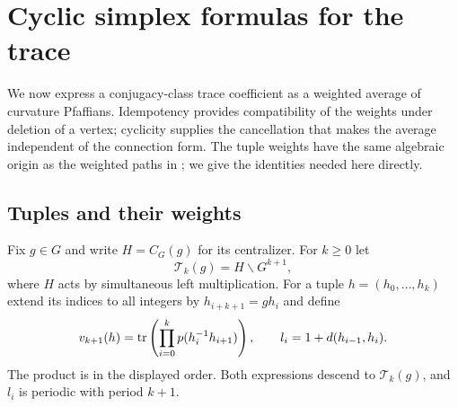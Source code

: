 \section{Cyclic simplex formulas for the trace}\label{sec:cyclic}

We now express a conjugacy-class trace coefficient as a weighted average
of curvature Pfaffians. Idempotency provides compatibility of the
weights under deletion of a vertex; cyclicity supplies the cancellation
that makes the average independent of the connection form.
The tuple weights have the same algebraic origin as the weighted
paths in \cite[Section~7]{OpenAIBass2026}; we give the identities
needed here directly.

\subsection{Tuples and their weights}
Fix $g\in G$ and write $H=C_G(g)$ for its centralizer. For $k\ge0$ let
\[
 \mathcal T_k(g)=H\backslash G^{k+1},
\]
where $H$ acts by simultaneous left multiplication. For a tuple
$h=(h_0,\ldots,h_k)$ extend its indices to all integers by
$h_{i+k+1}=gh_i$ and define
\begin{equation}\label{cy:weights}
 v_{k+1}(h)=\operatorname{tr}\left(\prod_{i=0}^k p(h_i^{-1}h_{i+1})\right),
 \qquad l_i=1+d(h_{i-1},h_i).
\end{equation}
The product is in the displayed order. Both expressions descend to
$\mathcal T_k(g)$, and $l_i$ is periodic with period $k+1$.

